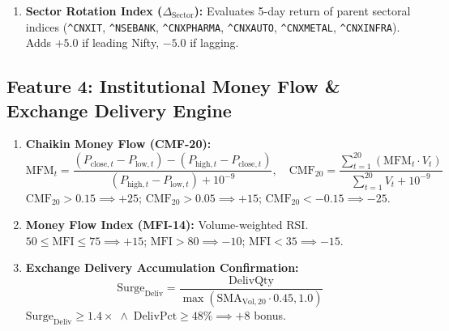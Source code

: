 \documentclass[11pt,a4paper]{article}
\begin{document}
\begin{enumerate}[leftmargin=*]
    \begin{equation}
    \text{RS}_{20d} = \left(\frac{P_{t} - P_{t-20}}{P_{t-20}} \times 100\right) - \left(\frac{\text{Nifty}_t - \text{Nifty}_{t-20}}{\text{Nifty}_{t-20}} \times 100\right)
    \end{equation}
    $\text{RS}_{20d} > 2.0\% \implies +8$ pts; $\text{RS}_{20d} < -4.0\% \implies -8$ pts.
    \item \textbf{Sector Rotation Index ($\Delta_{\text{Sector}}$):} Evaluates 5-day return of parent sectoral indices (\texttt{\^{}CNXIT}, \texttt{\^{}NSEBANK}, \texttt{\^{}CNXPHARMA}, \texttt{\^{}CNXAUTO}, \texttt{\^{}CNXMETAL}, \texttt{\^{}CNXINFRA}). Adds $+5.0$ if leading Nifty, $-5.0$ if lagging.
\end{enumerate}

\subsection{Feature 4: Institutional Money Flow \& Exchange Delivery Engine}
\begin{enumerate}[leftmargin=*]
    \item \textbf{Chaikin Money Flow (CMF-20):}
    \begin{equation}
    \text{MFM}_t = \frac{(P_{\text{close}, t} - P_{\text{low}, t}) - (P_{\text{high}, t} - P_{\text{close}, t})}{(P_{\text{high}, t} - P_{\text{low}, t}) + 10^{-9}}, \quad
    \text{CMF}_{20} = \frac{\sum_{t=1}^{20} (\text{MFM}_t \cdot V_t)}{\sum_{t=1}^{20} V_t + 10^{-9}}
    \end{equation}
    $\text{CMF}_{20} > 0.15 \implies +25$; $\text{CMF}_{20} > 0.05 \implies +15$; $\text{CMF}_{20} < -0.15 \implies -25$.
    \item \textbf{Money Flow Index (MFI-14):} Volume-weighted RSI. $50 \le \text{MFI} \le 75 \implies +15$; $\text{MFI} > 80 \implies -10$; $\text{MFI} < 35 \implies -15$.
    \item \textbf{Exchange Delivery Accumulation Confirmation:}
    \begin{equation}
    \text{Surge}_{\text{Deliv}} = \frac{\text{DelivQty}}{\max(\text{SMA}_{\text{Vol}, 20} \cdot 0.45, 1.0)}
    \end{equation}
    $\text{Surge}_{\text{Deliv}} \ge 1.4\times \;\land\; \text{DelivPct} \ge 48\% \implies +8$ bonus.
\end{enumerate}
\end{document}
